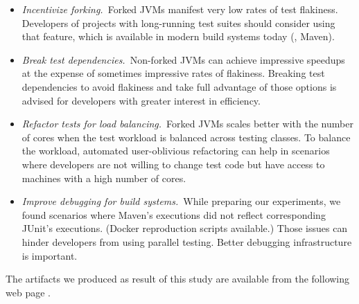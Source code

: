 \begin{itemize}
\item \emph{Incentivize forking.}~Forked JVMs manifest very low rates
  of test flakiness.  Developers of projects with long-running test
  suites should consider using that feature, which is available in
  modern build systems today (\eg{}, Maven).
\item \emph{Break test dependencies.}~Non-forked JVMs can achieve
  impressive speedups at the expense of sometimes impressive rates of
  flakiness.  Breaking test dependencies to avoid flakiness and take
  full advantage of those options is advised for developers with
  greater interest in efficiency.
\item \emph{Refactor tests for load balancing.}~Forked JVMs scales
  better with the number of cores when the test workload is balanced
  across testing classes.  To balance the workload, automated
  user-oblivious refactoring can help in scenarios where developers
  are not willing to change test code but have access to machines with
  a high number of cores.
\item \emph{Improve debugging for build systems.}~While preparing our
  experiments, we found scenarios where Maven's executions did not reflect
  corresponding JUnit's executions. (Docker reproduction scripts
  available.) Those issues can hinder developers from using parallel
  testing. Better debugging infrastructure is important.
\end{itemize}

The artifacts we produced as result of this study are available from
the following web page \webpage{}.


